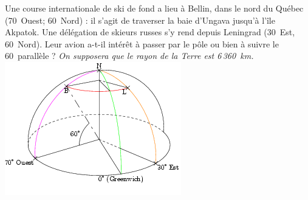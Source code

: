 
\begin{multicols}{2}
Une course internationale de ski de fond
a lieu à Bellin, dans le nord du Québec (70\degres\ Ouest; 60\degres\
Nord) : il s'agit de traverser la baie d'Ungava jusqu'à l'île
Akpatok. Une délégation de skieurs russes s'y rend depuis Leningrad
(30\degres\ Est, 60\degres\ Nord). Leur avion a-t-il intérêt à passer
par le pôle ou bien à suivre le 60\ieme\ parallèle ?
{\em On supposera que le rayon de la Terre est 6\,360~km.}\\
\includegraphics[scale=1]{RepS-48.png} 
\end{multicols}

